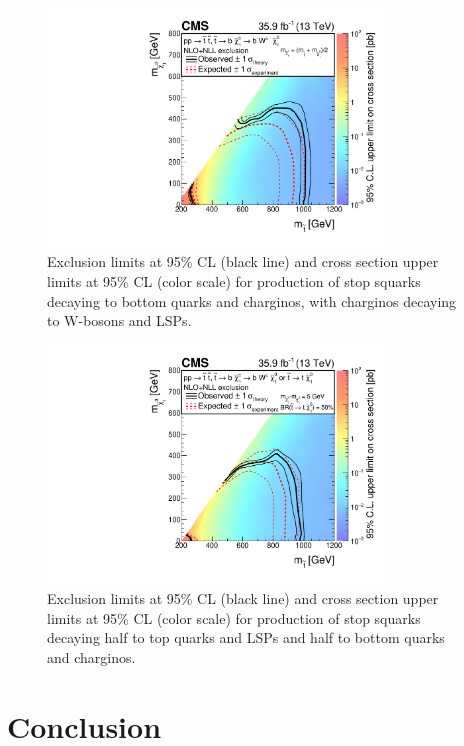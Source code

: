 \begin{figure}[htbp]
\centering
\includegraphics[width=0.8\textwidth]{figures/limits_T2bW.pdf}
\caption{Exclusion limits at 95\% CL (black line) and cross section
  upper limits at 95\% CL (color scale) for production of stop squarks
  decaying to bottom quarks and charginos, with charginos decaying to
  W-bosons and LSPs.}
\label{fig:stop:limits:t2bw}
\end{figure}

\begin{figure}[htbp]
\centering
\includegraphics[width=0.8\textwidth]{figures/limits_T2tb.pdf}
\caption{Exclusion limits at 95\% CL (black line) and cross section
  upper limits at 95\% CL (color scale) for production of stop squarks
  decaying half to top quarks and LSPs and half to bottom quarks and
  charginos.}
\label{fig:stop:limits:t2tb}
\end{figure}


\section{Conclusion}
\label{sec:stop:conclusion}

